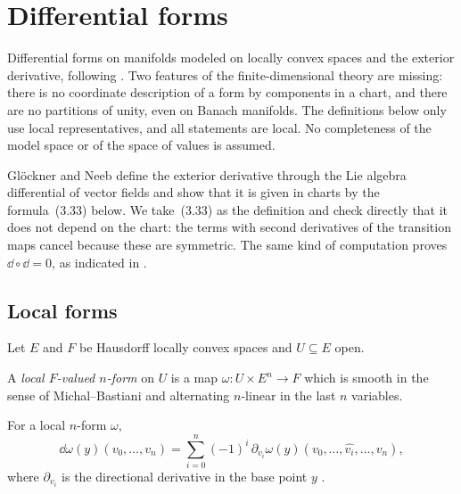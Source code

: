 \chapter{Differential forms}
\label{chap:forms}

Differential forms on manifolds modeled on locally convex spaces and the exterior derivative,
following \cite[Section~3.6]{GN26}. Two features of the finite-dimensional theory are missing:
there is no coordinate description of a form by components in a chart, and there are no
partitions of unity, even on Banach manifolds. The definitions below only use local
representatives, and all statements are local. No completeness of the model space or of the
space of values is assumed.

Glöckner and Neeb define the exterior derivative through the Lie algebra differential of vector
fields \cite[Proposition~3.6.7, formula~(3.29)]{GN26} and show that it is given in charts by the
formula~(3.33) below. We take~(3.33) as the definition and check directly that it does not depend
on the chart: the terms with second derivatives of the transition maps cancel because these are
symmetric. The same kind of computation proves $\dd \circ \dd = 0$, as indicated in
\cite[Remark~3.6.10]{GN26}.

\section{Local forms}

Let $E$ and $F$ be Hausdorff locally convex spaces and $U \subseteq E$ open.

\begin{definition}
  \label{def:local-form}
  \leanok
  A \emph{local $F$-valued $n$-form} on $U$ is a map $\omega \colon U \times E^n \to F$ which is
  smooth in the sense of Michal--Bastiani and alternating $n$-linear in the last $n$ variables.
\end{definition}

\begin{definition}
  \label{def:local-d}
  \leanok
  For a local $n$-form $\omega$,
  \[
    \dd\omega(y)(v_0, \dots, v_n) =
      \sum_{i=0}^{n} (-1)^i \, \partial_{v_i} \omega(y)(v_0, \dots, \widehat{v_i}, \dots, v_n),
  \]
  where $\partial_{v_i}$ is the directional derivative in the base point $y$
  \cite[(3.33)]{GN26}.
\end{definition}

